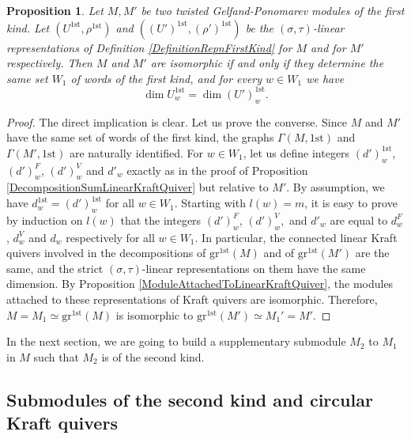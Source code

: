 \documentclass[12pt]{amsart}
\newtheorem{proposition}[theorem]{Proposition}
\theoremstyle{definition}
\newcommand{\<}{\langle}   %
\renewcommand{\>}{\rangle} %
\begin{document}
\begin{proposition}
    Let $M, M'$ be two twisted Gelfand-Ponomarev modules of the first kind. Let $(U^{1\mathrm{st}},\rho^{1\mathrm{st}})$ and $((U')^{1\mathrm{st}},(\rho')^{1\mathrm{st}})$ be the $(\sigma,\tau)$-linear representations of Definition \ref{DefinitionRepnFirstKind} for $M$ and for $M'$ respectively. Then $M$ and $M'$ are isomorphic if and only if they determine the same set $W_1$ of words of the first kind, and for every $w \in W_1$ we have 
    \begin{equation*}
        \dim U_{w}^{1\mathrm{st}} = \dim (U')_{w}^{1\mathrm{st}}.
    \end{equation*}
\end{proposition}

\begin{proof}
    The direct implication is clear. Let us prove the converse. Since $M$ and $M'$ have the same set of words of the first kind, the graphs $\Gamma(M,1\mathrm{st})$ and $\Gamma(M',1\mathrm{st})$ are naturally identified. For $w\in W_1$, let us define integers $(d')_w^{1\mathrm{st}}$, $(d')_w^F$, $(d')_w^V$ and $d'_w$ exactly as in the proof of Proposition \ref{DecompositionSumLinearKraftQuiver} but relative to $M'$. By assumption, we have $d_w^{1\mathrm{st}} = (d')_w^{1\mathrm{st}}$ for all $w \in W_1$. Starting with $l(w) = m$, it is easy to prove by induction on $l(w)$ that the integers $(d')_w^F$, $(d')_w^V,$ and $d'_w$ are equal to $d_w^F$, $d_w^V$ and $d_w$ respectively for all $w \in W_1$. In particular, the connected linear Kraft quivers involved in the decompositions of $\mathrm{gr}^{1\mathrm{st}}(M)$ and of $\mathrm{gr}^{1\mathrm{st}}(M')$ are the same, and the strict $(\sigma,\tau)$-linear representations on them have the same dimension. By Proposition \ref{ModuleAttachedToLinearKraftQuiver}, the modules attached to these representations of Kraft quivers are isomorphic. Therefore, $M = M_1 \simeq \mathrm{gr}^{1\mathrm{st}}(M)$ is isomorphic to $\mathrm{gr}^{1\mathrm{st}}(M') \simeq M_1' = M'$.
\end{proof}

In the next section, we are going to build a supplementary submodule $M_2$ to $M_1$ in $M$ such that $M_2$ is of the second kind. 

\subsection{Submodules of the second kind and circular Kraft quivers}
\end{document}
